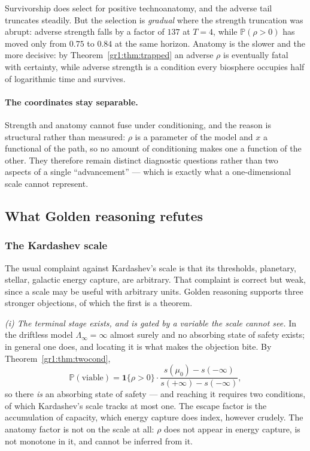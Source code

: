 \documentclass[11pt]{article}
\numberwithin{equation}{section}
\theoremstyle{plain}
\theoremstyle{definition}
\theoremstyle{remark}
\newcommand{\PP}{\mathbb{P}}
\newcommand{\one}{\mathbf{1}}
\begin{document}
\noindent Survivorship does select for positive technoanatomy, and the
adverse tail truncates steadily. But the selection is \emph{gradual}
where the strength truncation was abrupt: adverse strength falls by a
factor of $137$ at $T=4$, while $\PP(\rho>0)$ has moved only from
$0.75$ to $0.84$ at the same horizon. Anatomy is the slower and the more
decisive: by Theorem~\ref{gr1:thm:trapped} an adverse $\rho$ is
eventually fatal with certainty, while adverse strength is a condition
every biosphere occupies half of logarithmic time and survives.

\paragraph{The coordinates stay separable.}\label{gr:rem:separable}
Strength and anatomy cannot fuse under conditioning, and the reason is
structural rather than measured: $\rho$ is a parameter of the model and
$x$ a functional of the path, so no amount of conditioning makes one a
function of the other. They therefore remain distinct diagnostic
questions rather than two aspects of a single ``advancement'' --- which
is exactly what a one-dimensional scale cannot represent.

\subsection{What Golden reasoning refutes}\label{gr:sub:refutes}

\subsubsection{The Kardashev scale}\label{gr:subsub:kardashev}

The usual complaint against Kardashev's scale \cite{Kar64} is that its
thresholds, planetary, stellar, galactic energy capture, are
arbitrary. That complaint is correct but weak, since a scale may be
useful with arbitrary units. Golden reasoning supports three stronger
objections, of which the first is a theorem.

\emph{(i) The terminal stage exists, and is gated by a variable the
scale cannot see.} In the driftless model $\Lambda_\infty=\infty$
almost surely and no absorbing state of safety exists; in general one
does, and locating it is what makes the objection bite. By
Theorem~\ref{gr1:thm:twocond},
\[
\PP(\text{viable})=\one\{\rho>0\}\cdot
\frac{s(\mu_0)-s(-\infty)}{s(+\infty)-s(-\infty)},
\]
so there \emph{is} an absorbing state of safety --- and reaching it
requires two conditions, of which Kardashev's scale tracks at most one.
The escape factor is the accumulation of capacity, which energy
capture does index, however crudely. The anatomy factor is not on the
scale at all: $\rho$ does not appear in energy capture, is not
monotone in it, and cannot be inferred from it.
\end{document}
